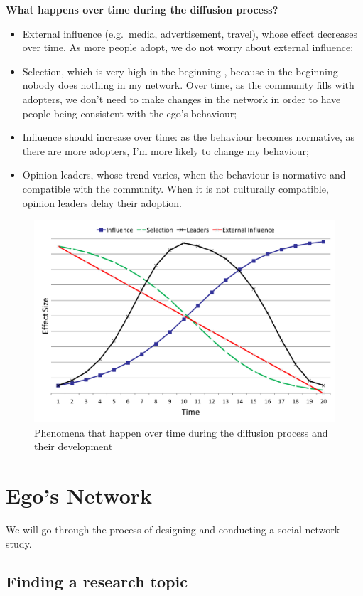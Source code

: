 \documentclass[
  notitlepage,
  onecolumn,
  openany]{book}
\providecommand{\tightlist}{%
  \setlength{\itemsep}{0pt}\setlength{\parskip}{0pt}}
\begin{document}
\textbf{What happens over time during the diffusion process?}

\begin{itemize}
\tightlist
\item
  External influence (e.g.~media, advertisement, travel), whose effect decreases over time. As more people adopt, we do not worry about external influence;
\item
  Selection, which is very high in the beginning , because in the beginning nobody does nothing in my network. Over time, as the community fills with adopters, we don't need to make changes in the network in order to have people being consistent with the ego's behaviour;
\item
  Influence should increase over time: as the behaviour becomes normative, as there are more adopters, I'm more likely to change my behaviour;
\item
  Opinion leaders, whose trend varies, when the behaviour is normative and compatible with the community. When it is not culturally compatible, opinion leaders delay their adoption.
\end{itemize}

\begin{figure}[h!]

{\centering \includegraphics[width=0.5\linewidth]{images/14-Christakis and Valente/Untitled 6} 

}

\caption{Phenomena that happen over time during the diffusion process and their development}\label{fig:unnamed-chunk-110}
\end{figure}

\hypertarget{egos-network}{%
\chapter{Ego's Network}\label{egos-network}}

We will go through the process of designing and conducting a social network study.

\hypertarget{finding-a-research-topic}{%
\section{Finding a research topic}\label{finding-a-research-topic}}
\end{document}

